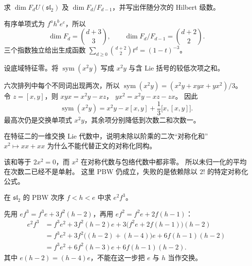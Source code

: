 \begin{exercise}\label{b5:ex:15-pbw-hilbert}
	求 \(\dim F_dU(\mathfrak{sl}_2)\) 及 \(\dim F_d/F_{d-1}\)，并写出伴随分次的 Hilbert 级数。
\end{exercise}
\begin{solution}
	有序单项式为 \(f^ah^be^c\)，所以
	\[
		\dim F_d=\binom{d+3}{3},\qquad \dim F_d/F_{d-1}=\binom{d+2}{2}.
	\]
	三个指数独立给出生成函数 \(\sum_{d\ge0}\binom{d+2}{2}t^d=(1-t)^{-3}\)。
\end{solution}

\begin{exercise}\label{b5:ex:15-symmetrization-cubic}
	设底域特征零。将 \(\operatorname{sym}(x^2y)\) 写成 \(x^2y\) 与含 Lie 括号的较低次项之和。
\end{exercise}
\begin{solution}
	六次排列中每个不同词出现两次，所以 \(\operatorname{sym}(x^2y)=(x^2y+xyx+yx^2)/3\)。 令 \(z=[x,y]\)，则 \(xyx=x^2y-xz\)， \(yx^2=x^2y-xz-zx\)。 因此
	\[
		\operatorname{sym}(x^2y) =x^2y-x[x,y]+\frac13\bigl[x,[x,y]\bigr].
	\]
	最高次仍是交换单项式 \(x^2y\)，其余项分别降低到次数二和次数一。
\end{solution}

\begin{exercise}\label{b5:ex:15-positive-characteristic-average}
	在特征二的一维交换 Lie 代数中，说明未除以阶乘的二次“对称化和” \(x^2\mapsto xx+xx\) 为什么不能代替正文的对称化同构。
\end{exercise}
\begin{solution}
	该和等于 \(2x^2=0\)，而 \(x^2\) 在对称代数与包络代数中都非零。 所以未归一化的平均在次数二已经不是单射。 这里 PBW 仍成立，失败的是依赖除以 \(2!\) 的特定对称化公式。
\end{solution}

\begin{exercise}\label{b5:ex:15-sl2-order-e2f3}
	在 \(\mathfrak{sl}_2\) 的 PBW 次序 \(f<h<e\) 中求 \(e^2f^3\)。
\end{exercise}
\begin{solution}
	先用 \(ef^3=f^3e+3f^2(h-2)\)，再用 \(ef^2=f^2e+2f(h-1)\)：
	\[
		\begin{aligned}
			e^2f^3 &=f^3e^2+3f^2(h-2)e +3\bigl(f^2e+2f(h-1)\bigr)(h-2)\\
			&=f^3e^2+3f^2\bigl((h-2)+(h-4)\bigr)e+6f(h-1)(h-2)\\
			&=f^3e^2+6f^2(h-3)e+6f(h-1)(h-2).
		\end{aligned}
	\]
	其中 \(e(h-2)=(h-4)e\)，不能在这一步把 \(e\) 与 \(h\) 当作交换。
\end{solution}

